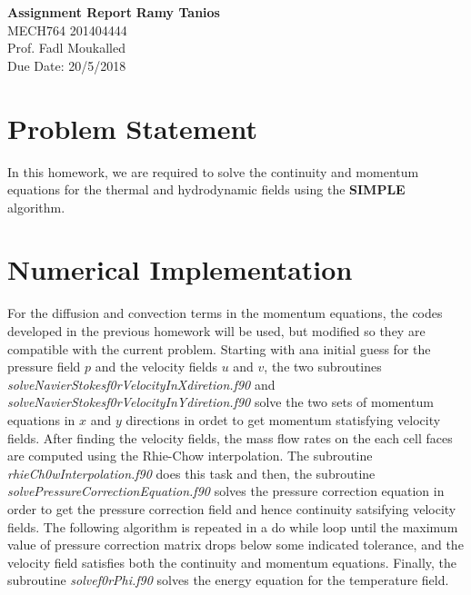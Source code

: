 \documentclass[a4paper, 11pt]{article}
\begin{document}
\noindent
\large\textbf{Assignment Report} \hfill \textbf{Ramy Tanios} \\
\normalsize MECH764 \hfill 201404444 \\
Prof. Fadl Moukalled \hfill \\ \hfill Due Date: 20/5/2018

\section*{Problem Statement}
In this homework, we are required to solve the continuity and momentum equations for the thermal and hydrodynamic fields using the \textbf{SIMPLE} algorithm.
\section*{Numerical Implementation}
For the diffusion and convection terms in the momentum equations, the codes developed in the previous homework will be used, but modified so they are compatible with the current problem. Starting with ana initial guess for the pressure field $p$ and the velocity fields $u$ and $v$, the two subroutines \textit{solveNavierStokesf0rVelocityInXdiretion.f90} and \textit{solveNavierStokesf0rVelocityInYdiretion.f90} solve the two sets of momentum equations in $x$ and $y$ directions in ordet to get momentum statisfying velocity fields. After finding the velocity fields, the mass flow rates on the each cell faces are computed using the Rhie-Chow interpolation. The subroutine \textit{rhieCh0wInterpolation.f90} does this task and then, the subroutine \textit{solvePressureCorrectionEquation.f90} solves the pressure correction equation in order to get the pressure correction field and hence continuity satsifying velocity fields. The following algorithm is repeated in a do while loop until the maximum value of pressure correction matrix drops below some indicated tolerance, and the velocity field satisfies both the continuity and momentum equations. 
Finally, the subroutine \textit{solvef0rPhi.f90} solves the energy equation for the temperature field. 
\end{document}
